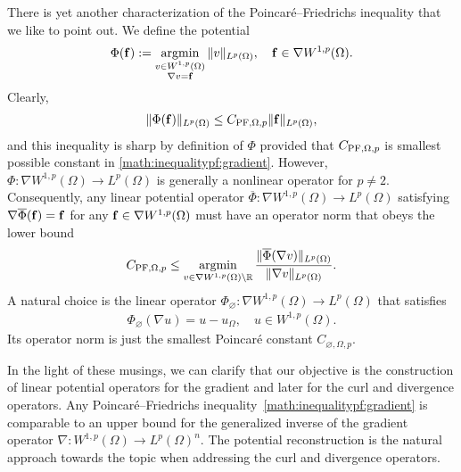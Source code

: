 \documentclass[a4paper]{article}
\begin{document}
There is yet another characterization of the Poincar\'e--Friedrichs inequality that we like to point out. 
We define the potential 
\begin{align*}
    \Phi( {\mathbf f} ) := \operatorname*{{\rm argmin}}\limits_{ \substack{ v \in W^{1,p}(\Omega) \\ \nabla v = {\mathbf f} } } \| v \|_{L^{p}(\Omega)},
    \quad 
    {\mathbf f} \in \nabla W^{1,p}(\Omega)
    .
\end{align*}
Clearly, 
\begin{align*}
    \| \Phi({\mathbf f}) \|_{L^p(\Omega)} \leq C_{{\rm PF},\Omega,p} \| {\mathbf f} \|_{L^p(\Omega)},
\end{align*}
and this inequality is sharp by definition of $\Phi$ provided that $C_{{\rm PF},\Omega,p}$ is smallest possible constant in \eqref{math:inequalitypf:gradient}. 
However, $\Phi : \nabla W^{1,p}(\Omega) \rightarrow L^p(\Omega)$ is generally a nonlinear operator for $p \neq 2$. 
Consequently, any linear potential operator $\overline\Phi : \nabla W^{1,p}(\Omega) \rightarrow L^p(\Omega)$
satisfying $\nabla \overline\Phi( {\mathbf f} ) = {\mathbf f}$ for any ${\mathbf f} \in \nabla W^{1,p}(\Omega)$ must have an operator norm that obeys the lower bound 
\begin{align*}
    C_{{\rm PF},\Omega,p} 
    \leq 
    \operatorname*{{\rm argmin}}\limits_{ v \in \nabla W^{1,p}(\Omega) \setminus {\mathbb R} } 
    \frac{ \| \overline\Phi(\nabla v) \|_{L^p(\Omega)} }{ \| \nabla v \|_{L^p(\Omega)} }
    .
\end{align*}
A natural choice is the linear operator $\Phi_{\varnothing} : \nabla W^{1,p}(\Omega) \rightarrow L^p(\Omega)$ that satisfies 
\begin{align*}
    \Phi_{\varnothing}( \nabla u ) = u - u_{\Omega},
    \quad 
    u \in W^{1,p}(\Omega)
    .
\end{align*}
Its operator norm is just the smallest Poincar\'e constant $C_{\varnothing,\Omega,p}$.

In the light of these musings, we can clarify that our objective is the construction of linear potential operators for the gradient and later for the curl and divergence operators. 
Any Poincar\'e--Friedrichs inequality~\eqref{math:inequalitypf:gradient} is comparable to an upper bound for the generalized inverse of the gradient operator $\nabla : W^{1,p}(\Omega) \rightarrow L^{p}(\Omega)^{n}$. The potential reconstruction is the natural approach towards the topic when addressing the curl and divergence operators. 
\end{document}
